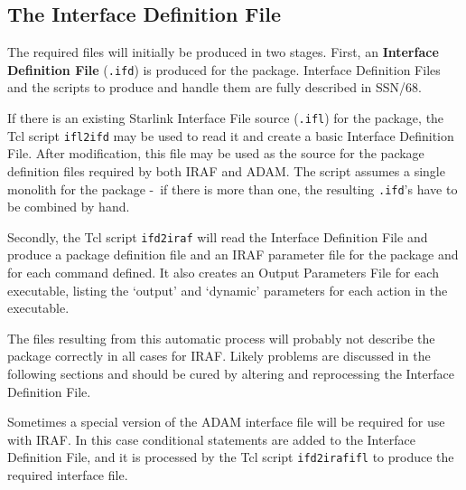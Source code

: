 \documentclass[twoside,11pt]{article}
\newcommand{\xref}[3]{#1}
\newcommand{\xlabel}[1]{}
\newcommand{\dash}{--}
\renewcommand{\dash}{-}
\begin{document}
\subsection{\xlabel{the_interface_definition_file}The Interface Definition File}
The required files will initially be produced in two stages. First, an
{\bfseries Interface Definition File} (\texttt{.ifd}) is produced for the 
package.
Interface Definition Files and the scripts to produce and handle them are fully
described in
\xref{SSN/68}{ssn68}{}.

If there is an existing Starlink Interface File source (\texttt{.ifl}) for 
the package, the Tcl script 
\xref{\texttt{ifl2ifd}}{ssn68}{creating_ifds_from_interface_files} 
may be used to read it and create a basic 
Interface Definition File. 
After modification, this file may be used as the source for the package 
definition files required by both IRAF and ADAM.
The script assumes a single monolith for the package \dash\ if there is more 
than one, the resulting \texttt{.ifd}'s have to be combined by hand.

Secondly, the Tcl script 
\xref{\texttt{ifd2iraf}}{ssn68}{producing_iraf_files_from_an_ifd} 
will read the Interface Definition File 
and produce a package definition file and an IRAF parameter file for
the package and for each command defined. It also creates an Output Parameters
File for each executable, listing the `output' and 
`dynamic' parameters for each action in the executable.

The files resulting from this automatic process will probably not describe
the package correctly in all cases for IRAF.
Likely problems are discussed in the following sections and should be cured by
altering and reprocessing the Interface Definition File.

Sometimes a special version of the ADAM interface file will be required for
use with IRAF. In this case conditional statements are added to the
Interface Definition File, and it is processed by the Tcl script
\xref{\texttt{ifd2irafifl}}{ssn68}{ifd2irafifl} to produce the required 
interface file.
\end{document}
